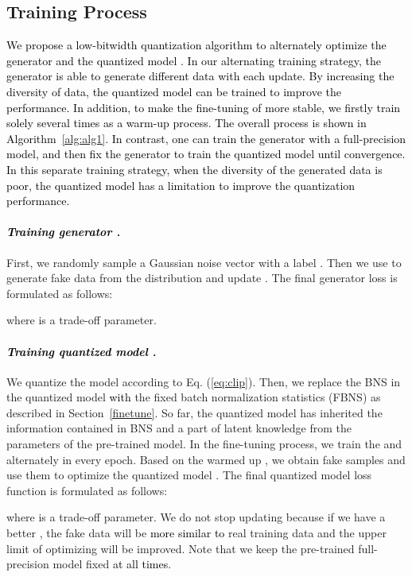 \documentclass[runningheads]{llncs}
\def\jie{\textcolor{black}}
\def\new{\textcolor{black}}
\begin{document}
\subsection{Training Process}
\label{train_process}
\jie{We propose a low-bitwidth quantization algorithm to alternately optimize the generator  and the quantized model .
In our alternating training strategy, the generator is able to generate different data with each update.
By increasing the diversity of data, the quantized model  can be trained to improve the performance.
\new{In addition}, to make the fine-tuning of  more stable, we firstly train  solely several times as a warm-up process.
The overall process is shown in Algorithm~\ref{alg:alg1}.
In contrast, one can train the generator  with a full-precision model, and then fix the generator to train the quantized model  until convergence.
In this separate training strategy, when the diversity of the generated data is poor, the quantized model has a limitation to improve the quantization performance. 
}


\paragraph{\emph{\textbf{\jie{Training generator .}}}}
First, we randomly sample a Gaussian noise vector  with a label . 
Then we use  to generate fake data from the distribution and update . 
The final generator loss  is formulated as follows:

where  is a trade-off parameter.




\paragraph{\emph{\textbf{\jie{Training quantized model .}}}}
We quantize the model according to Eq. (\ref{eq:clip}).
Then, we replace the BNS in the quantized model \new{with} the fixed batch normalization statistics (FBNS) as described in Section~\ref{finetune}.
So far, the quantized model has inherited the information contained in BNS and a part of latent knowledge from the parameters of the pre-trained model.
In the fine-tuning process, we train the  and  alternately in every epoch.
Based on the warmed up , we obtain fake samples and use them to optimize the quantized model . The final quantized model loss function  is formulated as follows:

where  is a trade-off parameter.
We do not stop updating  because if we have a better ,  the fake data will be \new{more similar to} real training data and the upper limit of optimizing  will be improved.
Note that we keep the pre-trained full-precision model fixed \new{at all times}.
\end{document}

